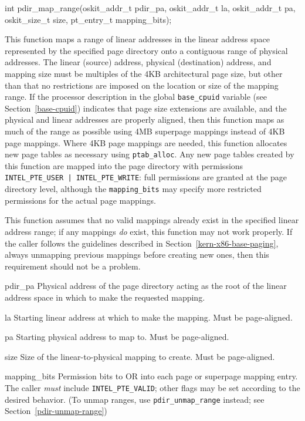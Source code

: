 \label{pdir-map-range}
\begin{apisyn}

	\funcproto int pdir_map_range(oskit_addr_t pdir_pa, oskit_addr_t la,
				      oskit_addr_t pa,
				      oskit_size_t size, pt_entry_t mapping_bits);
\end{apisyn}
\begin{apidesc}
	This function maps a range of linear addresses
	in the linear address space represented by the specified page directory
	onto a contiguous range of physical addresses.
	The linear (source) address, physical (destination) address,
	and mapping size must be multiples of the 4KB architectural page size,
	but other than that no restrictions are imposed
	on the location or size of the mapping range.
	If the processor description in the global {\tt base_cpuid} variable
	(see Section~\ref{base-cpuid})
	indicates that page size extensions are available,
	and the physical and linear addresses are properly aligned,
	then this function maps as much of the range as possible
	using 4MB superpage mappings instead of 4KB page mappings.
	Where 4KB page mappings are needed,
	this function allocates new page tables as necessary
	using {\tt ptab_alloc}.
	Any new page tables created by this function
	are mapped into the page directory with permissions
	{\tt INTEL_PTE_USER | INTEL_PTE_WRITE}:
	full permissions are granted at the page directory level,
	although the {\tt mapping_bits} may specify more restricted permissions
	for the actual page mappings.

	This function assumes that
	no valid mappings already exist in the specified linear address range;
	if any mappings \emph{do} exist, this function may not work properly.
	If the caller follows the guidelines
	described in Section~\ref{kern-x86-base-paging},
	always unmapping previous mappings before creating new ones,
	then this requirement should not be a problem.
\end{apidesc}
\begin{apiparm}
	\item[pdir_pa]
		Physical address of the page directory
		acting as the root of the linear address space
		in which to make the requested mapping.
	\item[la]
		Starting linear address at which to make the mapping.
		Must be page-aligned.
	\item[pa]
		Starting physical address to map to.
		Must be page-aligned.
	\item[size]
		Size of the linear-to-physical mapping to create.
		Must be page-aligned.
	\item[mapping_bits]
		Permission bits to OR into each page or superpage mapping entry.
		The caller \emph{must} include {\tt INTEL_PTE_VALID};
		other flags may be set according to the desired behavior.
		(To unmap ranges, use {\tt pdir_unmap_range} instead;
		see Section~\ref{pdir-unmap-range})
\end{apiparm}
